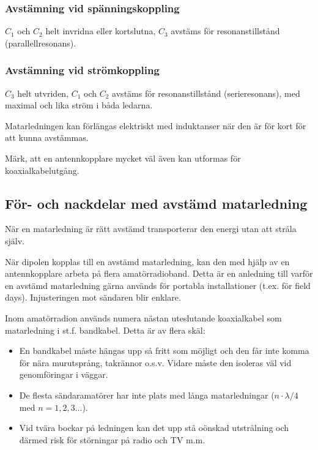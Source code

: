 \subsubsection{Avstämning vid spänningskoppling}

\(C_1\) och \(C_2\) helt invridna eller kortslutna, \(C_3\) avstäms
för resonanstillstånd (parallellresonans).

\subsubsection{Avstämning vid strömkoppling}

\(C_3\) helt utvriden, \(C_1\) och \(C_2\) avstäms för
resonanstillstånd (serieresonans), med maximal och lika ström i båda
ledarna.

Matarledningen kan förlängas elektriskt med induktanser när den är för
kort för att kunna avstämmas.

Märk, att en antennkopplare mycket väl även kan utformas för
koaxialkabelutgång.

\subsection{För- och nackdelar med avstämd matarledning}

När en matarledning är rätt avstämd transporterar den energi utan att
stråla själv.

När dipolen kopplas till en avstämd matarledning, kan den med hjälp av
en antennkopplare arbeta på flera amatörradioband. Detta är en
anledning till varför en avstämd matarledning gärna används för
portabla installationer (t.ex. för field days).  Injusteringen mot
sändaren blir enklare.

Inom amatörradion används numera nästan uteslutande koaxialkabel som
matarledning i st.f. bandkabel. Detta är av flera skäl:
\begin{itemize}
\item En bandkabel måste hängas upp så fritt som möjligt och den får
  inte komma för nära murutsprång, takrännor o.s.v. Vidare måste den
  isoleras väl vid genomföringar i väggar.
\item De flesta sändaramatörer har inte plats med långa matarledningar
  (\(n\cdot\lambda/4\) med \(n = 1, 2, 3 \dots\)).
\item Vid tvära bockar på ledningen kan det upp stå oönskad
  utstrålning och därmed risk för störningar på radio och TV m.m.
\end{itemize}
